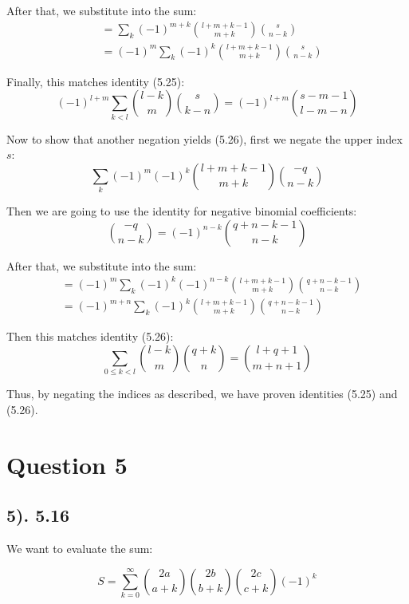 \documentclass[12pt]{article}
\begin{document}
After that, we substitute into the sum:
\begin{align*}
    &= \sum_{k} {(-1)}^{m+k} \binom{l+m+k-1}{m+k} \binom{s}{n-k} \\
    &= {(-1)}^m \sum_{k} {(-1)}^k \binom{l+m+k-1}{m+k} \binom{s}{n-k}
\end{align*}

Finally, this matches identity (5.25):
\begin{equation}
    {(-1)}^{l+m} \sum_{k < l} \binom{l-k}{m} \binom{s}{k-n} = {(-1)}^{l+m} \binom{s-m-1}{l-m-n}
\end{equation}

Now to show that another negation yields (5.26), first we negate the upper index \( s \):
\begin{equation}
    \sum_{k} {(-1)}^m {(-1)}^k \binom{l+m+k-1}{m+k} \binom{-q}{n-k}
\end{equation}

Then we are going to use the identity for negative binomial coefficients:
\begin{equation}
    \binom{-q}{n-k} = {(-1)}^{n-k} \binom{q+n-k-1}{n-k}
\end{equation}

After that, we substitute into the sum:
\begin{align*}
    &= {(-1)}^m \sum_{k} {(-1)}^k {(-1)}^{n-k} \binom{l+m+k-1}{m+k} \binom{q+n-k-1}{n-k} \\
    &= {(-1)}^{m+n} \sum_{k} {(-1)}^k \binom{l+m+k-1}{m+k} \binom{q+n-k-1}{n-k}
\end{align*}

Then this matches identity (5.26):
\begin{equation}
    \sum_{0 \le k < l} \binom{l-k}{m} \binom{q+k}{n} = \binom{l+q+1}{m+n+1}
\end{equation}

Thus, by negating the indices as described, we have proven identities (5.25) and (5.26).

\section*{Question 5}
\subsection*{5). 5.16}
We want to evaluate the sum:

\[
S = \sum_{k=0}^{\infty} \binom{2a}{a+k} \binom{2b}{b+k} \binom{2c}{c+k} (-1)^k
\]
\end{document}
